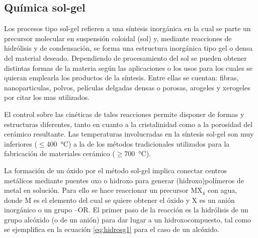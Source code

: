 
	\subsection{Química sol-gel}

	Los procesos tipo sol-gel refieren a una síntesis inorgánica en la cual se parte un precursor molecular en suspensión coloidal (sol) y, mediante reacciones de hidrólisis y de condensación, se  forma una estructura inorgánica tipo gel o densa del material deseado. Dependiendo de procesamiento del sol se pueden obtener distintas formas de la materia según las aplicaciones o los usos para los cuales se quieran emplearla los productos de la síntesis. Entre ellas se cuentan: fibras, nanoparticulas, polvos, películas delgadas densas o porosas, arogeles y xerogeles por citar los mas utilizados.

	El control sobre las cinéticas de tales reacciones permite disponer de formas y estructuras diferentes, tanto en cuanto a la cristalinidad como a la porosidad del cerámico resultante. Las temperaturas involucradas en la síntesis sol-gel son muy inferiores ($\leq$\SI{400}{\celsius}) a la de los métodos tradicionales utilizados para la fabricación de materiales cerámico ($\geq$\SI{700}{\celsius}).\cite{Brinker1990,Jolivet2000,Wright2001}

	La formación de un óxido por el método sol-gel implica conectar centros metálicos mediante puentes oxo o hidroxo para generar (hidroxo)polímeros de metal en solución. Para ello se hace reaccionar un precursor MX$_4$ con agua, donde M es el elemento del cual se quiere obtener el óxido y X es un anión inorgánico o un grupo –OR. El primer paso de la reacción es la hidrólisis de un grupo alcóxido (o de un anión) para dar lugar a un hidroxocompuesto, tal como se ejemplifica en la ecuación \ref{eq:hidrosg1} para el caso de un alcóxido.
			
